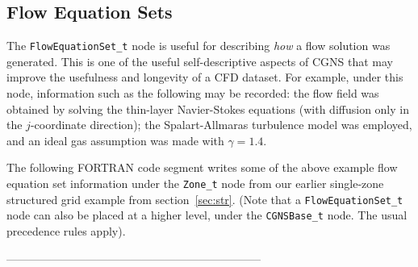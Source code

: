 \documentclass[12pt]{article}
\begin{document}
\subsection{Flow Equation Sets} \label{sec:floweqns}

The {\tt FlowEquationSet\_t} node is useful for describing {\it how}
a flow solution was generated.  This is one of the useful
self-descriptive aspects of CGNS that may improve the usefulness and
longevity of a CFD dataset.  For example, under this node, information
such as the following may be recorded:  the flow field was obtained by
solving the thin-layer Navier-Stokes equations (with diffusion only in the
$j$-coordinate direction); the Spalart-Allmaras turbulence
model was employed, and an ideal gas assumption was made with $\gamma=1.4$.

The following FORTRAN code segment writes some of 
the above example flow equation set information
under the {\tt Zone\_t} node from our earlier single-zone structured
grid example from section~\ref{sec:str}.  (Note that 
a {\tt FlowEquationSet\_t} node can also be placed at a higher level,
under the {\tt CGNSBase\_t} node.  The
usual precedence rules apply).

--------------------------------------------------------------------
\end{document}

